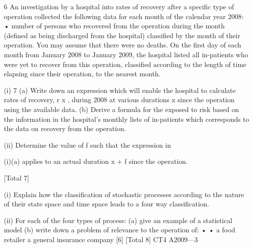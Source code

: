 6 An investigation by a hospital into rates of recovery after a specific type of operation
collected the following data for each month of the calendar year 2008:
•
number of persons who recovered from the operation during the month (defined as
being discharged from the hospital) classified by the month of their operation.
You may assume that there were no deaths.
On the first day of each month from January 2008 to January 2009, the hospital listed
all in-patients who were yet to recover from this operation, classified according to the
length of time elapsing since their operation, to the nearest month.
\item (i)
7
(a) Write down an expression which will enable the hospital to calculate
rates of recovery, r x , during 2008 at various durations x since the
operation using the available data.
(b) Derive a formula for the exposed to risk based on the information in
the hospital’s monthly lists of in-patients which corresponds to the data
on recovery from the operation.

\item (ii) Determine the value of f such that the expression in \item (i)(a) applies to an actual
duration x + f since the operation.

[Total 7]
\item (i) Explain how the classification of stochastic processes according to the nature
of their state space and time space leads to a four way classification.

\item (ii) For each of the four types of process:
(a) give an example of a statistical model
(b) write down a problem of relevance to the operation of:
•
•
a food retailer
a general insurance company
[6]
[Total 8]
CT4 A2009—3

\newpage

